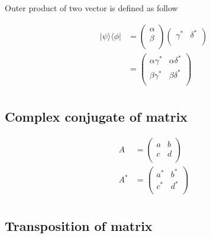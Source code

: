 \documentclass{article}
\begin{document}
Outer product of two vector is defined as follow

\begin{equation}
    \begin{split}
        |\psi\rangle\langle\phi| & = \begin{pmatrix}
            \alpha \\
            \beta \\
        \end{pmatrix} \begin{pmatrix}
            \gamma^* & \delta^* \\
        \end{pmatrix} \\
        & = \begin{pmatrix}
            \alpha\gamma^* & \alpha\delta^* \\
            \beta\gamma^* & \beta\delta^* \\
        \end{pmatrix} \\
    \end{split}
\end{equation}

\subsection{Complex conjugate of matrix}

\begin{equation}
    \begin{split}
        A & = \begin{pmatrix}
            a & b \\
            c & d \\
        \end{pmatrix} \\
        A^* & = \begin{pmatrix}
            a^* & b^* \\
            c^* & d^* \\
        \end{pmatrix} \\
    \end{split}
\end{equation}

\subsection{Transposition of matrix}
\end{document}
